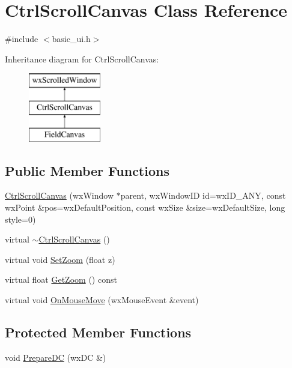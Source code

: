 \hypertarget{a00096}{\section{Ctrl\-Scroll\-Canvas Class Reference}
\label{a00096}
}


{\ttfamily \#include $<$basic\-\_\-ui.\-h$>$}

Inheritance diagram for Ctrl\-Scroll\-Canvas\-:\begin{figure}[H]
\begin{center}
\leavevmode
\includegraphics[height=3.000000cm]{a00096}
\end{center}
\end{figure}
\subsection*{Public Member Functions}
\begin{DoxyCompactItemize}
\item 
\hyperlink{a00096_a8ee529db7adae241b36be8e3ef81329d}{Ctrl\-Scroll\-Canvas} (wx\-Window $\ast$parent, wx\-Window\-I\-D id=wx\-I\-D\-\_\-\-A\-N\-Y, const wx\-Point \&pos=wx\-Default\-Position, const wx\-Size \&size=wx\-Default\-Size, long style=0)
\item 
virtual \hyperlink{a00096_a2785ff09c9ae7c341935e5399e2e40d6}{$\sim$\-Ctrl\-Scroll\-Canvas} ()
\item 
virtual void \hyperlink{a00096_a3ad771782a6dbb4c590e18a797a56c42}{Set\-Zoom} (float z)
\item 
virtual float \hyperlink{a00096_a599eb616ea16b1cb8ba0252dcb58c91e}{Get\-Zoom} () const 
\item 
virtual void \hyperlink{a00096_a8a4c47c47d37722abd13437e61ed384f}{On\-Mouse\-Move} (wx\-Mouse\-Event \&event)
\end{DoxyCompactItemize}
\subsection*{Protected Member Functions}
\begin{DoxyCompactItemize}
\item 
void \hyperlink{a00096_a7baa0510d8c6ee7f14e7bfadfd1ea872}{Prepare\-D\-C} (wx\-D\-C \&)
\end{DoxyCompactItemize}
